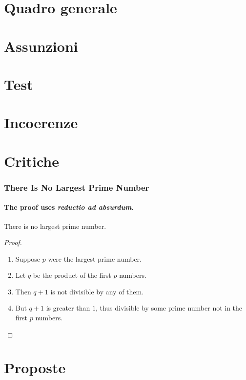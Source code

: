 \documentclass[13pt]{beamer}
\begin{document}

\subtitle{Our first quantum algorithm}

\date{\today}

\begin{frame}
\maketitle
\end{frame}
\section{Quadro generale}
\section{Assunzioni}
\section{Test}
\section{Incoerenze}
\section{Critiche}
\begin{frame}
\frametitle{There Is No Largest Prime Number}
\framesubtitle{The proof uses \textit{reductio ad absurdum}.}
\begin{theorem}
There is no largest prime number.
\end{theorem}
\begin{proof}
\begin{enumerate}
\item<1-| alert@1> Suppose $p$ were the largest prime number.
\item<2-> Let $q$ be the product of the first $p$ numbers.
\item<3-> Then $q+1$ is not divisible by any of them.
\item<1-> But $q + 1$ is greater than $1$, thus divisible by some prime
number not in the first $p$ numbers.\qedhere
\end{enumerate}
\end{proof}
\end{frame}
\section{Proposte}
\end{document}
